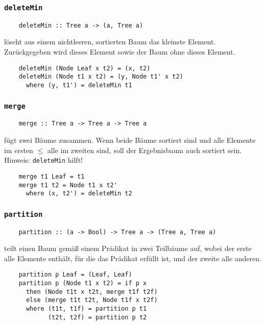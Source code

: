 \documentclass{beamer}
\begin{document}
\begin{frame}[fragile]
  \frametitle{\lstinline{deleteMin}}
  \begin{lstlisting}
    deleteMin :: Tree a -> (a, Tree a)
  \end{lstlisting}
  löscht aus einem nichtleeren, sortierten Baum das kleinste Element.
  Zurückgegeben wird dieses Element sowie der Baum ohne dieses Element.
  \pause
  \begin{lstlisting}
    deleteMin (Node Leaf x t2) = (x, t2)
    deleteMin (Node t1 x t2) = (y, Node t1' x t2)
      where (y, t1') = deleteMin t1
  \end{lstlisting}
\end{frame}

\begin{frame}[fragile]
  \frametitle{\lstinline{merge}}
  \begin{lstlisting}
    merge :: Tree a -> Tree a -> Tree a
  \end{lstlisting}
  fügt zwei Bäume zusammen.
  Wenn beide Bäume sortiert sind und alle Elemente im ersten $≤$ alle im zweiten sind,
  soll der Ergebnisbaum auch sortiert sein.
  Hinweis: \lstinline{deleteMin} hilft!
  \pause
  \begin{lstlisting}
    merge t1 Leaf = t1
    merge t1 t2 = Node t1 x t2'
      where (x, t2') = deleteMin t2
  \end{lstlisting}
\end{frame}

\begin{frame}[fragile]
  \frametitle{\lstinline{partition}}
  \begin{lstlisting}
    partition :: (a -> Bool) -> Tree a -> (Tree a, Tree a)
  \end{lstlisting}
  teilt einen Baum gemäß einem Prädikat in zwei Teilbäume auf,
  wobei der erste alle Elemente enthält, für die das Prädikat erfüllt ist,
  und der zweite alle anderen.
  \pause
  \begin{lstlisting}
    partition p Leaf = (Leaf, Leaf)
    partition p (Node t1 x t2) = if p x
      then (Node t1t x t2t, merge t1f t2f)
      else (merge t1t t2t, Node t1f x t2f)
      where (t1t, t1f) = partition p t1
            (t2t, t2f) = partition p t2
  \end{lstlisting}
\end{frame}
\end{document}
